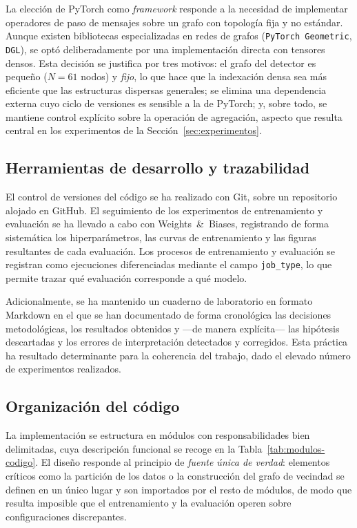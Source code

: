 La elección de PyTorch como \emph{framework} responde a la necesidad de implementar operadores de
paso de mensajes sobre un grafo con topología fija y no estándar. Aunque existen bibliotecas
especializadas en redes de grafos (\texttt{PyTorch Geometric}, \texttt{DGL}), se optó
deliberadamente por una implementación directa con tensores densos. Esta decisión se justifica por
tres motivos: el grafo del detector es pequeño ($N = 61$ nodos) y \emph{fijo}, lo que hace que la
indexación densa sea más eficiente que las estructuras dispersas generales; se elimina una
dependencia externa cuyo ciclo de versiones es sensible a la de PyTorch; y, sobre todo, se mantiene
control explícito sobre la operación de agregación, aspecto que resulta central en los experimentos
de la Sección~\ref{sec:experimentos}.

\subsection{Herramientas de desarrollo y trazabilidad}
\label{subsec:herramientas}

El control de versiones del código se ha realizado con Git, sobre un repositorio alojado en GitHub.
El seguimiento de los experimentos de entrenamiento y evaluación se ha llevado a cabo con
Weights~\&~Biases, registrando de forma sistemática los hiperparámetros, las curvas de entrenamiento
y las figuras resultantes de cada evaluación. Los procesos de entrenamiento y evaluación se
registran como ejecuciones diferenciadas mediante el campo \texttt{job\_type}, lo que permite
trazar qué evaluación corresponde a qué modelo.

Adicionalmente, se ha mantenido un cuaderno de laboratorio en formato Markdown en el que se han
documentado de forma cronológica las decisiones metodológicas, los resultados obtenidos y ---de
manera explícita--- las hipótesis descartadas y los errores de interpretación detectados y
corregidos. Esta práctica ha resultado determinante para la coherencia del trabajo, dado el elevado
número de experimentos realizados.

\subsection{Organización del código}
\label{subsec:organizacion-codigo}

La implementación se estructura en módulos con responsabilidades bien delimitadas, cuya
descripción funcional se recoge en la Tabla~\ref{tab:modulos-codigo}. El diseño responde al
principio de \emph{fuente única de verdad}: elementos críticos como la partición de los datos o la
construcción del grafo de vecindad se definen en un único lugar y son importados por el resto de
módulos, de modo que resulta imposible que el entrenamiento y la evaluación operen sobre
configuraciones discrepantes.

